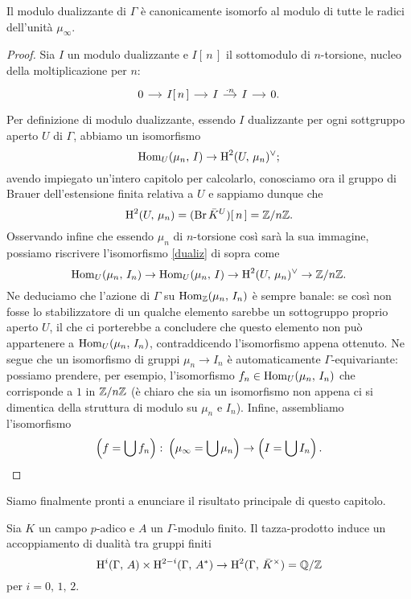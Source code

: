 \begin{proposition}
	Il modulo dualizzante di $ \Gamma $ è canonicamente isomorfo al modulo di tutte le radici dell'unità $ \mu_\infty $.
\end{proposition}
\begin{proof}
	Sia $ I $ un modulo dualizzante e $ I[\, n\, ] $ il sottomodulo di $ n $-torsione, nucleo della moltiplicazione per $ n $:
	\[ \begin{tikzcd}[column sep = small]
	0 \rar & I[\, n \,] \rar & I \rar["\cdot n"] & I \rar & 0.
	\end{tikzcd} \]
	Per definizione di modulo dualizzante, essendo $ I $ dualizzante per ogni sottgruppo aperto $ U $ di $ \Gamma $, abbiamo un isomorfismo
	\begin{equation}\label{dualiz}
	\operatorname{Hom}_U(\mu_n, \, I) \to \operatorname{H}^2(U, \, \mu_n)^\vee;
	\end{equation}
	avendo impiegato un'intero capitolo per calcolarlo, conosciamo ora il gruppo di Brauer dell'estensione finita relativa a $ U $ e sappiamo dunque che $$  \operatorname{H}^2(U, \, \mu_n) = (\operatorname{Br} \bar{K}^U)[\, n\, ] = \mathbb{Z}/n\mathbb{Z}.  $$
	Osservando infine che essendo $ \mu_n $ di $ n $-torsione così sarà la sua immagine, possiamo riscrivere l'isomorfismo \eqref{dualiz} di sopra come
	\[ \operatorname{Hom}_U(\mu_n, \, I_n) \to \operatorname{Hom}_U(\mu_n, \, I) \to \operatorname{H}^2(U, \, \mu_n)^\vee \to \mathbb{Z}/n\mathbb{Z}. \]
	Ne deduciamo che l'azione di $ \Gamma $ su $ \operatorname{Hom}_{\mathbb{Z}}(\mu_n, \, I_n) $ è sempre banale: se così non fosse lo stabilizzatore di un qualche elemento sarebbe un sottogruppo proprio aperto $ U $, il che ci porterebbe a concludere che questo elemento non può appartenere a $ \operatorname{Hom}_U(\mu_n, \, I_n) $, contraddicendo l'isomorfismo appena ottenuto. Ne segue che un isomorfismo di gruppi $ \mu_n \to I_n $ è automaticamente $ \Gamma $-equivariante: possiamo prendere, per esempio, l'isomorfismo $ f_n \in \operatorname{Hom}_U(\mu_n, \, I_n) $ che corrisponde a $ 1 $ in $ \mathbb{Z}/n\mathbb{Z} $ (è chiaro che sia un isomorfismo non appena ci si dimentica della struttura di modulo su $ \mu_n $ e $ I_n $). Infine, assembliamo l'isomorfismo
	\[ \left(f = \bigcup f_n\right) \colon \left(\mu_\infty = \bigcup \mu_n\right) \to \left(I = \bigcup I_n\right). \qedhere \]
\end{proof}

Siamo finalmente pronti a enunciare il risultato principale di questo capitolo.
\begin{theorem}
	Sia $ K $ un campo $ p $-adico e $ A $ un $ \Gamma $-modulo finito. Il tazza-prodotto induce un accoppiamento di dualità tra gruppi finiti
	\[ \operatorname{H}^i(\Gamma, \, A) \times \operatorname{H}^{2-i}(\Gamma, \, A^*) \to \operatorname{H}^2(\Gamma, \, \bar{K}^\times) = \mathbb{Q} / \mathbb{Z} \]
	per $ i = 0, \, 1, \, 2 $.
\end{theorem}


